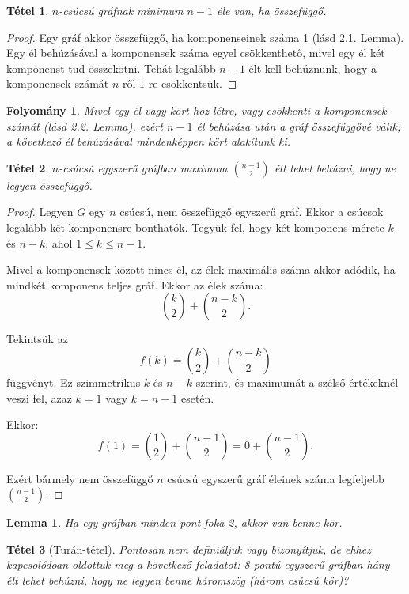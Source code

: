 \documentclass{article}
\newtheorem{corollary}{Folyomány}
\newtheorem{lemma}{Lemma}[section]
\newtheorem{theorem}{Tétel}[section]
\begin{document}
\begin{theorem}
    $n$-csúcsú gráfnak minimum $n-1$ éle van, ha összefüggő.
\end{theorem}
\begin{proof}
    Egy gráf akkor összefüggő, ha komponenseinek száma 1 (lásd 2.1. Lemma). Egy él behúzásával a komponensek száma egyel csökkenthető, mivel egy él két komponenst tud összekötni. Tehát legalább $n-1$ élt kell behúznunk, hogy a komponensek számát $n$-ről $1$-re csökkentsük.
\end{proof}
\begin{corollary}
    Mivel egy él vagy kört hoz létre, vagy csökkenti a komponensek számát (lásd 2.2. Lemma), ezért $n-1$ él behúzása után a gráf összefüggővé válik; a következő él behúzásával mindenképpen kört alakítunk ki.
\end{corollary}

\begin{theorem}
    $n$-csúcsú egyszerű gráfban maximum $\binom{n-1}{2}$ élt lehet behúzni, hogy ne legyen összefüggő.
\end{theorem}
\begin{proof}
    Legyen $G$ egy $n$ csúcsú, nem összefüggő egyszerű gráf. Ekkor a csúcsok legalább két komponensre bonthatók. Tegyük fel, hogy két komponens mérete $k$ és $n-k$, ahol $1 \le k \le n-1$.
    
    Mivel a komponensek között nincs él, az élek maximális száma akkor adódik, ha mindkét komponens teljes gráf. Ekkor az élek száma:
    \[
    \binom{k}{2} + \binom{n-k}{2}.
    \]
    
    Tekintsük az
    \[
    f(k) = \binom{k}{2} + \binom{n-k}{2}
    \]
    függvényt. Ez szimmetrikus $k$ és $n-k$ szerint, és maximumát a szélső értékeknél veszi fel, azaz $k=1$ vagy $k=n-1$ esetén.
    
    Ekkor:
    \[
    f(1) = \binom{1}{2} + \binom{n-1}{2} = 0 + \binom{n-1}{2}.
    \]
    
    Ezért bármely nem összefüggő $n$ csúcsú egyszerű gráf éleinek száma legfeljebb $\binom{n-1}{2}$.
    
\end{proof}

\begin{lemma}
    Ha egy gráfban minden pont foka 2, akkor van benne kör.
\end{lemma}

\begin{theorem}[Turán-tétel]
    Pontosan nem definiáljuk vagy bizonyítjuk, de ehhez kapcsolódoan oldottuk meg a következő feladatot: 8 pontú egyszerű gráfban hány élt lehet behúzni, hogy ne legyen benne háromszög (három csúcsú kör)?
\end{theorem}
\end{document}
